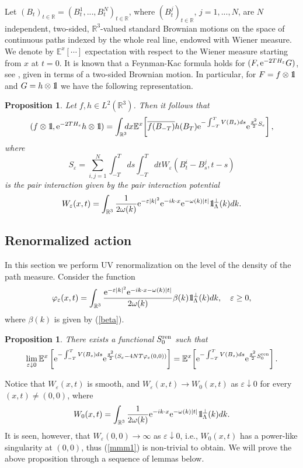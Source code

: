 \documentclass[11pt]{article}
\newtheorem{proposition}[theorem]{Proposition}
\def\bbbone{{\mathchoice {\rm 1\mskip-4mu l} {\rm 1\mskip-4mu l}
{\rm 1\mskip-4.5mu l} {\rm 1\mskip-5mu l}}}
\def\one{\bbbone}
\newcommand{\kp}{\one_\Lambda^\perp(k)}
\providecommand{\idx}{\int_{\BR} \!\!\! dx}
\newcommand{\Ebb}{{\mathbb E}}
\providecommand{\eq}[1]{\begin{equation}\label{#1}}
\providecommand{\en}{\end{equation}}
\providecommand{\BR}{{\mathbb{R}^3 }}
\providecommand{\iijj}{\sum_{i,j=1}^N}
\providecommand{\RR}{\mathbb{R}}
\providecommand{\kak}[1]{(\ref{#1})}
\providecommand{\LR}{{L^2(\BR)}}
\providecommand{\hn}{H}%
\providecommand{\ov}[1]{\overline{#1}}
\providecommand{\e}{{\rm e}}
\providecommand{\1}{\mathbb{1}}
\providecommand{\eps}{\varepsilon}
\providecommand{\ren}{{\rm ren}}
\begin{document}
Let $(B_t)_{t\in\RR}=(B_t^1,...,B_t^N)_{t\in\RR}$, where $(B_t^j)_{t\in\RR}$, $j=1,...,N$, are $N$
independent, two-sided, $\BR$-valued standard Brownian motions on the space of continuous paths indexed
by the whole real line, endowed with Wiener measure. We denote by $\Ebb^x[\cdots]$ expectation with
respect to the Wiener measure starting from  $x$ at $t=0$. It is known that a Feynman-Kac formula holds
for $(F,\e^{-2T\hn_\eps}G)$, see \cite[Theorem  6.3]{lhb11}, given in terms of a two-sided Brownian motion.
In particular, for $F=f\otimes \one$ and $G=h\otimes \one$ we have the following representation.
\begin{proposition}
Let $f,h\in\LR$. Then it follows that
\begin{align*}
(f\otimes \one, \e^{-2T\hn_\eps} h\otimes  \one) = \idx \Ebb^x\!\left[\ov{f(B_{-T})} h(B_T)
\e^{-\int_{-T}^T V(B_s) ds} \e^{\frac{g^2}{2} S_\eps} \right],
\end{align*}where
\eq{regint}
S_\eps= \iijj \int _{-T}^T ds\int_{-T}^T dt
W_\eps (B_t^i-B_s^j,t-s)
\en
is the pair interaction given by the pair interaction potential
\begin{equation}
\label{eq:nelsonWreg}
W_\eps (x,t) =  \int_{\BR} \frac{1}{2\omega(k)} \e^{-\eps |k|^2} \e^{-ik\cdot x} \e^{-\omega(k)|t|}\kp dk.
\end{equation}
\end{proposition}


\subsection{Renormalized action}
In this section we perform UV renormalization on the level of the density of the path measure. Consider the
function
\begin{equation}
\label{eq:phiW}
\varphi_\eps(x,t) =  \int_{\BR} \frac{\e^{-\eps |k|^2} \e^{-ik\cdot x-\omega(k)|t|}}{2 \omega(k)}
\beta(k)\kp dk,\quad \eps\geq 0,
\end{equation}
where $\beta(k)$ is given by \kak{beta}.

\begin{proposition}
There exists a functional $S_0^\ren $ such that
\eq{mmm1}
\lim_{\eps\downarrow 0}\Ebb^x \left[\e^{-\int_{-T}^TV(B_s)ds} \e^{\frac{g^2}{2}( S_\eps-4NT\varphi_\eps(0,0))}\right] =
\Ebb^x\!\left[\e^{-\int_{-T}^TV(B_s)ds} \e^{\frac{g^2}{2}S_0^\ren }\right].
\en
\end{proposition}
\noindent
Notice that $W_\eps (x,t)$ is smooth, and
$W_\eps (x,t)\to  W_0(x,t)$ as $\eps\downarrow0$ for every
$(x,t)\neq (0,0)$, where
\eq{tooi}
W_0(x,t)=\int_{\BR}\frac{1}{2\omega(k)}\e^{-ik\cdot x} \e^{-\omega(k)|t|} \kp dk.
\en
It is seen, however, that $W_\eps (0,0)\to \infty$ as $\eps\downarrow 0$, i.e., $W_0(x,t)$ has a power-like
singularity at $(0,0)$, thus \kak{mmm1} is non-trivial to obtain. We will prove the above proposition
through a sequence of lemmas below.
\end{document}
